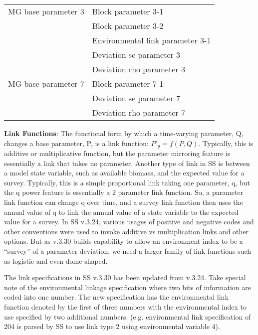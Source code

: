  \begin{center}
 	\begin{longtable}{p{5cm} p{10cm}}
	 	\hline
	 	MG base parameter 3 & Block parameter 3-1\\
	 	                    & Block parameter 3-2\\
	 	                    & Environmental link parameter 3-1\\
	 	                    & Deviation se parameter 3 \\
	 	                    & Deviation rho parameter 3 \\
		MG base parameter 7 & Block parameter 7-1 \\
							& Deviation se parameter 7 \\
							& Deviation rho parameter 7 \\
		\hline	 	                    
	 	       
 	\end{longtable}
 \end{center}
 
\noindent \textbf{Link Functions}:  The functional form by which a time-varying parameter, Q, changes a base parameter, P, is a link function:  $P’_y=f(P,Q)$.  Typically, this is additive or multiplicative function, but the parameter mirroring feature is essentially a link that takes no parameter.  Another type of link in SS is between a model state variable, such as available biomass, and the expected value for a survey.  Typically, this is a simple proportional link taking one parameter, q, but the q power feature is essentially a 2 parameter link function.  So, a parameter link function can change q over time, and a survey link function then uses the annual value of q to link the annual value of a state variable to the expected value for a survey.  In SS v.3.24, various usages of positive and negative codes and other conventions were used to invoke additive vs multiplication links and other options.  But as v.3.30 builds capability to allow an environment index to be a “survey” of a parameter deviation, we need a larger family of link functions such as logistic and even dome-shaped.

The link specifications in SS v.3.30 has been updated from v.3.24.  Take special note of the environmental linkage specification where two bits of information are coded into one number.  The new specification has the environmental link function denoted by the first of three numbers with the environmental index to use specified by two additional numbers. (e.g. environmental link specification of 204 is parsed by SS to use link type 2 using environmental variable 4).


